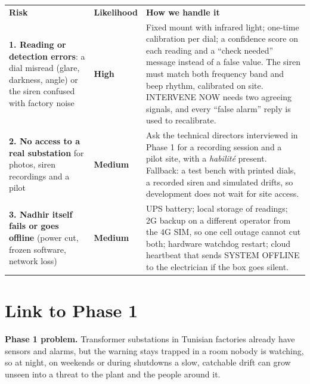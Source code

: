 \documentclass[10pt]{article}
\begin{document}
\noindent\begin{tabularx}{\linewidth}{>{\raggedright\arraybackslash}p{4.2cm} >{\centering\arraybackslash}p{2.1cm} Y}
\textbf{Risk} & \textbf{Likelihood} & \textbf{How we handle it} \\
\textbf{1. Reading or detection errors}: a dial misread (glare, darkness, angle) or the siren confused with factory noise &
\textbf{High} &
Fixed mount with infrared light; one-time calibration per dial; a confidence score on each reading and a ``check needed'' message instead of a false value. The siren must match both frequency band and beep rhythm, calibrated on site. INTERVENE NOW needs two agreeing signals, and every ``false alarm'' reply is used to recalibrate. \\
\textbf{2. No access to a real substation} for photos, siren recordings and a pilot &
\textbf{Medium} &
Ask the technical directors interviewed in Phase 1 for a recording session and a pilot site, with a \emph{habilité} present. Fallback: a test bench with printed dials, a recorded siren and simulated drifts, so development does not wait for site access. \\
\textbf{3. Nadhir itself fails or goes offline} (power cut, frozen software, network loss) &
\textbf{Medium} &
UPS battery; local storage of readings; 2G backup on a different operator from the 4G SIM, so one cell outage cannot cut both; hardware watchdog restart; cloud heartbeat that sends SYSTEM OFFLINE to the electrician if the box goes silent. \\
\end{tabularx}

\section{Link to Phase 1}

\textbf{Phase 1 problem.} Transformer substations in Tunisian factories already have sensors and alarms, but the warning stays trapped in a room nobody is watching, so at night, on weekends or during shutdowns a slow, catchable drift can grow unseen into a threat to the plant and the people around it.
\end{document}
